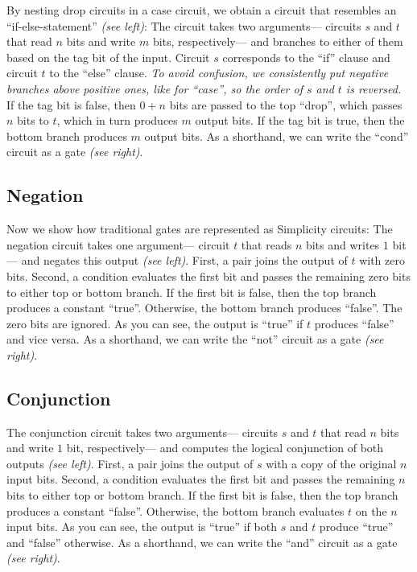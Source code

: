 
%
By nesting drop circuits in a case circuit,
we obtain a circuit that resembles an \enquote{if-else-statement} \emph{(see left)}:
The circuit takes two arguments---%
circuits $s$ and $t$ that read $n$ bits and write $m$ bits,
respectively---%
and branches to either of them based on the tag bit of the input.
Circuit $s$ corresponds to the \enquote{if} clause
and circuit $t$ to the \enquote{else} clause.
\emph{To avoid confusion,
we consistently put negative branches above positive ones,
like for \enquote{case},
so the order of $s$ and $t$ is reversed.}
If the tag bit is false,
then $0 + n$ bits are passed to the top \enquote{drop},
which passes $n$ bits to $t$,
which in turn produces $m$ output bits.
If the tag bit is true,
then the bottom branch produces $m$ output bits.
%
As a shorthand,
we can write the \enquote{cond} circuit as a gate \emph{(see right)}.

\subsection{Negation}


%
Now we show how traditional gates are represented as Simplicity circuits:
The negation circuit takes one argument---%
circuit $t$ that reads $n$ bits and writes $1$ bit---%
and negates this output \emph{(see left)}.
First,
a pair joins the output of $t$ with zero bits.
Second,
a condition evaluates the first bit
and passes the remaining zero bits to either top or bottom branch.
If the first bit is false,
then the top branch produces a constant \enquote{true}.
Otherwise,
the bottom branch produces \enquote{false}.
The zero bits are ignored.
As you can see,
the output is \enquote{true} if $t$ produces \enquote{false} and vice versa.
%
As a shorthand,
we can write the \enquote{not} circuit as a gate \emph{(see right)}.

\subsection{Conjunction}


%
The conjunction circuit takes two arguments---%
circuits $s$ and $t$ that read $n$ bits and write $1$ bit, respectively---%
and computes the logical conjunction of both outputs \emph{(see left)}.
First,
a pair joins the output of $s$ with a copy of the original $n$ input bits.
Second,
a condition evaluates the first bit
and passes the remaining $n$ bits to either top or bottom branch.
If the first bit is false,
then the top branch produces a constant \enquote{false}.
Otherwise,
the bottom branch evaluates $t$ on the $n$ input bits.
As you can see,
the output is \enquote{true} if both $s$ and $t$ produce \enquote{true}
and \enquote{false} otherwise.
%
As a shorthand,
we can write the \enquote{and} circuit as a gate \emph{(see right)}.

